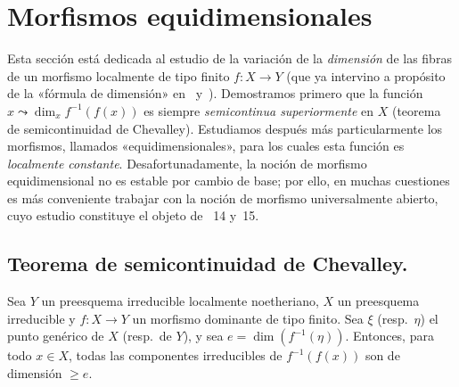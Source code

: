 \section{Morfismos equidimensionales}
\label{section:IV.13}


Esta sección está dedicada al estudio de la variación de la \emph{dimensión} de las fibras de un morfismo localmente de tipo finito $f:X\to Y$ (que ya intervino a propósito de la «fórmula de dimensión» en~ y~).
Demostramos primero  que la función $x\leadsto\dim_x f^{-1}(f(x))$ es siempre \emph{semicontinua superiormente} en $X$ (teorema de semicontinuidad de Chevalley).
Estudiamos después más particularmente los morfismos, llamados «equidimensionales», para los cuales esta función es \emph{localmente constante}.
Desafortunadamente, la noción de morfismo equidimensional no es estable por cambio de base; por ello, en muchas cuestiones es más conveniente trabajar con la noción de morfismo universalmente abierto, cuyo estudio constituye el objeto de \textsection\textsection~14 y~15.

\subsection{Teorema de semicontinuidad de Chevalley.}
\label{subsection:IV.13.1}

\begin{lemma}[13.1.1]
\label{IV.13.1.1}
Sea $Y$ un preesquema irreducible localmente noetheriano, $X$ un preesquema irreducible y $f:X\to Y$ un morfismo dominante de tipo finito.
Sea $\xi$ (resp.\ $\eta$) el punto genérico de $X$ (resp.\ de $Y$), y sea $e=\dim(f^{-1}(\eta))$.
Entonces, para todo $x\in X$, todas las componentes irreducibles de $f^{-1}(f(x))$ son de dimensión $\geq e$.
\end{lemma}


